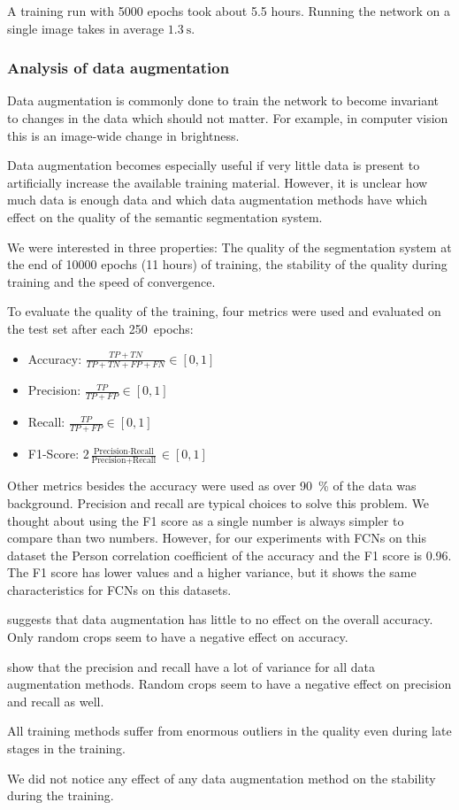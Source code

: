 A training run with 5000 epochs took about 5.5 hours. Running the network on a
single image takes in average $\SI{1.3}{\second}$.


\subsubsection{Analysis of data augmentation}

Data augmentation is commonly done to train the network to become invariant to
changes in the data which should not matter. For example, in computer vision
this is an image-wide change in brightness.

Data augmentation becomes especially useful if very little data is present to
artificially increase the available training material. However, it is unclear
how much data is enough data and which data augmentation methods have which
effect on the quality of the semantic segmentation system.

We were interested in three properties: The quality of the segmentation system
at the end of \num{10000} epochs (11 hours) of training, the stability of the
quality during training and the speed of convergence.

To evaluate the quality of the training, four metrics were used and evaluated
on the test set after each 250~epochs:

\begin{itemize}
    \item Accuracy: $\frac{TP + TN}{TP + TN + FP + FN} \in [0, 1]$
    \item Precision: $\frac{TP}{TP + FP} \in [0, 1]$
    \item Recall: $\frac{TP}{TP + FP} \in [0, 1]$
    \item F1-Score: $2 \frac{\text{Precision} \cdot \text{Recall}}{\text{Precision} + \text{Recall}} \in [0, 1]$
\end{itemize}

Other metrics besides the accuracy were used as over \SI{90}{\percent} of the
data was background. Precision and recall are typical choices to solve this
problem. We thought about using the F1 score as a single number is always
simpler to compare than two numbers. However, for our experiments with FCNs on
this dataset the Person correlation coefficient of the accuracy and the F1
score is 0.96. The F1 score has lower values and a higher variance, but it
shows the same characteristics for FCNs on this datasets.

 suggests that data augmentation has little to no
effect on the overall accuracy. Only random crops seem to have a negative
effect on accuracy.

 show that the precision
and recall have a lot of variance for all data augmentation methods. Random
crops seem to have a negative effect on precision and recall as well.

All training methods suffer from enormous outliers in the quality even during
late stages in the training.

We did not notice any effect of any data augmentation method on the stability
during the training.

